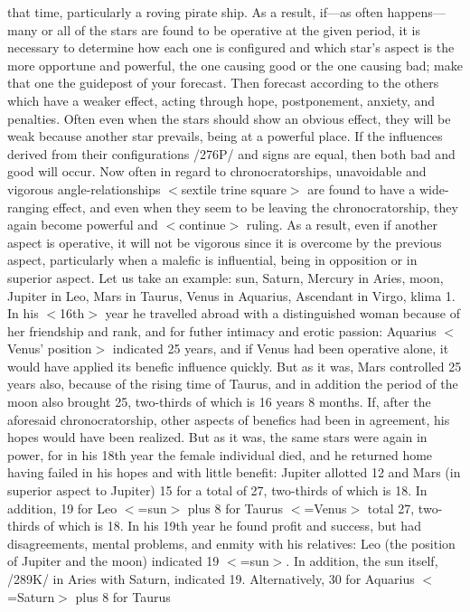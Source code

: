 that time, particularly a roving pirate ship.
As a result, if—as often happens—many or all of the stars are found to be operative at the given period,
it is necessary to determine how each one is configured and which star’s aspect is the more opportune and
powerful, the one causing good or the one causing bad; make that one the guidepost of your forecast. Then
forecast according to the others which have a weaker effect, acting through hope, postponement, anxiety,
and penalties. Often even when the stars should show an obvious effect, they will be weak because another
star prevails, being at a powerful place. If the influences derived from their configurations /276P/ and signs
are equal, then both bad and good will occur. Now often in regard to chronocratorships, unavoidable and
vigorous angle-relationships $<$sextile trine square$>$ are found to have a wide-ranging effect, and even when
they seem to be leaving the chronocratorship, they again become powerful and $<$continue$>$ ruling. As a
result, even if another aspect is operative, it will not be vigorous since it is overcome by the previous
aspect, particularly when a malefic is influential, being in opposition or in superior aspect.
Let us take an example: sun, Saturn, Mercury in Aries, moon, Jupiter in Leo, Mars in Taurus, Venus
in Aquarius, Ascendant in Virgo, klima 1. In his $<$16th$>$ year he travelled abroad with a distinguished
woman because of her friendship and rank, and for futher intimacy and erotic passion: Aquarius $<$Venus’
position$>$ indicated 25 years, and if Venus had been operative alone, it would have applied its benefic
influence quickly. But as it was, Mars controlled 25 years also, because of the rising time of Taurus, and
in addition the period of the moon also brought 25, two-thirds of which is 16 years 8 months. If, after the
aforesaid chronocratorship, other aspects of benefics had been in agreement, his hopes would have been
realized. But as it was, the same stars were again in power, for in his 18th year the female individual died,
and he returned home having failed in his hopes and with little benefit: Jupiter allotted 12 and Mars (in
superior aspect to Jupiter) 15 for a total of 27, two-thirds of which is 18. In addition, 19 for Leo $<$=sun$>$
plus 8 for Taurus $<$=Venus$>$ total 27, two-thirds of which is 18.
In his 19th year he found profit and success, but had disagreements, mental problems, and enmity with
his relatives: Leo (the position of Jupiter and the moon) indicated 19 $<$=sun$>$. In addition, the sun itself,
/289K/ in Aries with Saturn, indicated 19. Alternatively, 30 for Aquarius $<$=Saturn$>$ plus 8 for Taurus
